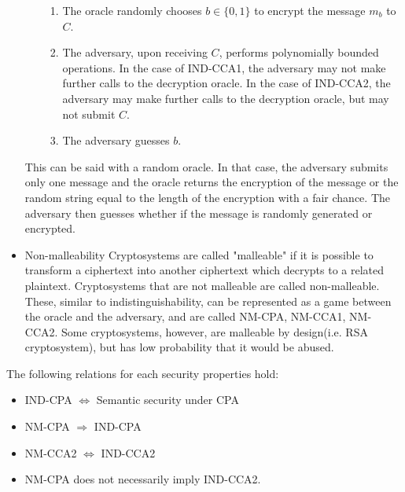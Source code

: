 \documentclass{report}
\begin{document}
\begin{itemize}
\begin{itemize}
\begin{enumerate}
					\item The oracle randomly chooses $b \in \{0,1\}$ to encrypt the message $m_b$ to $C$.
					\item The adversary, upon receiving $C$, performs polynomially bounded operations.
						\subitem In the case of IND-CCA1, the adversary may not make further calls to the decryption oracle.
						\subitem In the case of IND-CCA2, the adversary may make further calls to the decryption oracle, but may not submit $C$.
					\item The adversary guesses $b$.
				\end{enumerate}
			\end{itemize}
			This can be said with a random oracle. In that case, the adversary submits only one message and the oracle returns the encryption of the message or the random string equal to the length of the encryption with a fair chance. The adversary then guesses whether if the message is randomly generated or encrypted.

			\item Non-malleability
			\subitem Cryptosystems are called "malleable" if it is possible to transform a ciphertext into another ciphertext which decrypts to a related plaintext. Cryptosystems that are not malleable are called non-malleable. These, similar to indistinguishability, can be represented as a game between the oracle and the adversary, and are called NM-CPA, NM-CCA1, NM-CCA2. Some cryptosystems, however, are malleable by design(i.e. RSA cryptosystem), but has low probability that it would be abused.
		\end{itemize}
	
		\begin{thm}
			The following relations for each security properties hold:
			\begin{itemize}
				\item IND-CPA $\Leftrightarrow$ Semantic security under CPA
				\item NM-CPA $\Rightarrow$ IND-CPA
				\item NM-CCA2 $\Leftrightarrow$ IND-CCA2
				\item NM-CPA  does not necessarily imply IND-CCA2.
			\end{itemize}
		\end{thm}
		
\end{document}
